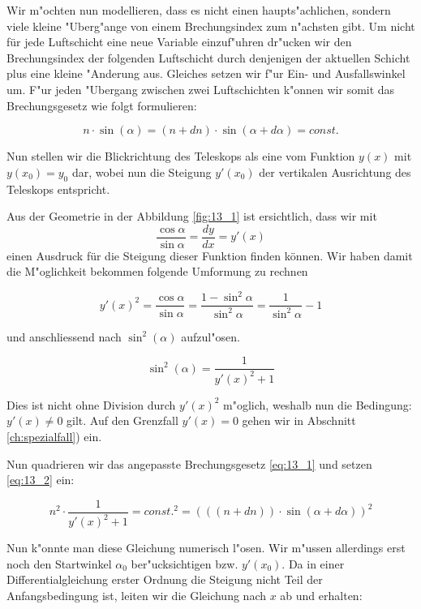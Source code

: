 \begin{refsection}
Wir m"ochten nun modellieren, dass es nicht einen haupts"achlichen, sondern viele kleine "Uberg"ange von einem Brechungsindex zum n"achsten gibt. 
Um nicht für jede Luftschicht eine neue Variable einzuf"uhren dr"ucken wir den Brechungsindex der folgenden Luftschicht durch denjenigen der aktuellen Schicht plus eine kleine "Anderung aus. 
Gleiches setzen wir f"ur Ein- und Ausfallswinkel um. 
F"ur jeden "Ubergang zwischen zwei Luftschichten k"onnen wir somit das Brechungsgesetz wie folgt formulieren:

\begin{equation} \label{eq:13_1}
  n \cdot \sin(\alpha) = (n + dn) \cdot \sin(\alpha + d\alpha) = const.
\end{equation}

Nun stellen wir die Blickrichtung des Teleskops als eine vom Funktion $y(x)$ mit $y(x_0) = y_0$ dar, wobei nun die Steigung $y'(x_0)$ der vertikalen Ausrichtung des Teleskops entspricht.

Aus der Geometrie in der Abbildung \ref{fig:13_1} ist ersichtlich, dass wir mit 
$$\frac{\cos \alpha}{\sin \alpha} = \frac{dy}{dx} = y'(x)$$
einen Ausdruck für die Steigung dieser Funktion finden können. 
Wir haben damit die M"oglichkeit bekommen folgende Umformung zu rechnen

$$ y'(x)^2 = \frac{\cos \alpha}{\sin \alpha} = \frac{1 - \sin^2 \alpha}{\sin^2 \alpha} = \frac{1}{\sin^2 \alpha} - 1$$

und anschliessend nach $\sin^2(\alpha)$ aufzul"osen.

\begin{equation} \label{eq:13_2}
\sin^2 (\alpha) = \frac{1}{y'(x)^2 + 1}
\end{equation}

Dies ist nicht ohne Division durch $y'(x)^2$ m"oglich, weshalb nun die Bedingung: $y'(x) \neq 0$ gilt.
Auf den Grenzfall $y'(x) = 0$ gehen wir in Abschnitt \ref{ch:spezialfall}) ein.

Nun quadrieren wir das angepasste Brechungsgesetz \ref{eq:13_1} und setzen \ref{eq:13_2} ein:

$$n^2 \cdot \frac{1}{y'(x)^2 + 1} = const.^2 = (((n + dn)) \cdot \sin(\alpha + d\alpha))^2$$

Nun k"onnte man diese Gleichung numerisch l"osen. 
Wir m"ussen allerdings erst noch den Startwinkel $\alpha_0$ ber"ucksichtigen bzw. $y'(x_0)$.
Da in einer Differentialgleichung erster Ordnung die Steigung nicht Teil der Anfangsbedingung ist, leiten wir die Gleichung nach $x$ ab und erhalten:


\end{refsection}
